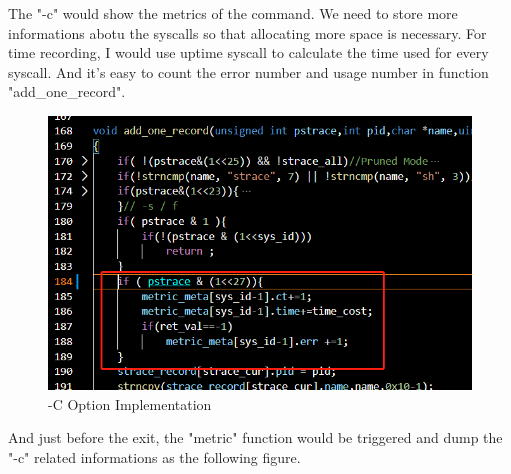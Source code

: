 \documentclass[11pt,oneside,a4paper]{article}
\begin{document}
The "-c" would show the metrics of the command. We need to store more informations abotu 
the syscalls so that allocating more space is necessary. 
For time recording, I would use uptime syscall to calculate the time used for every syscall.
And it's easy to count the error number and usage number in function "add\_one\_record".
\begin{figure}[H]
    \includegraphics[width=4.75in]{1-30.png}
    \centering
    \caption{-C Option Implementation}
\end{figure}
And just before the exit, the "metric" function would be triggered and dump the "-c" 
related informations as the following figure.
\end{document}
